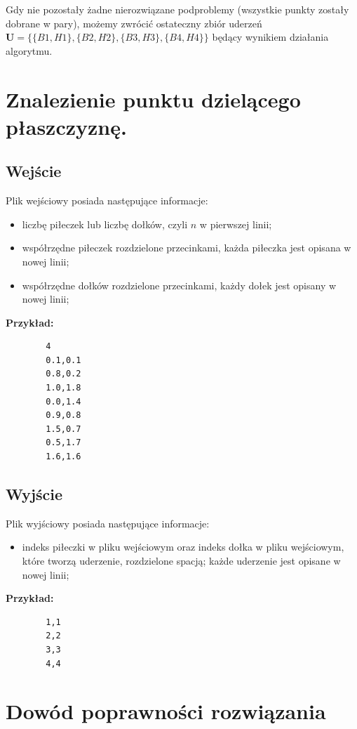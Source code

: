 \documentclass[10pt,a4paper]{article}
\begin{document}
	Gdy nie pozostały żadne nierozwiązane podproblemy (wszystkie punkty zostały dobrane w pary), możemy zwrócić ostateczny zbiór uderzeń $\mathbf{U} = \{\{B1,H1\},\{B2,H2\},\{B3,H3\},\{B4,H4\}\}$ będący wynikiem działania algorytmu.
		
	\section{Znalezienie punktu dzielącego płaszczyznę.}
	
	\subsection{Wejście}
	

	Plik wejściowy posiada następujące informacje:
	\begin{itemize}
		\item liczbę piłeczek lub liczbę dołków, czyli $n$ w pierwszej linii;
		\item współrzędne piłeczek rozdzielone przecinkami, każda piłeczka jest opisana w nowej linii;
		\item współrzędne dołków rozdzielone przecinkami, każdy dołek jest opisany w nowej linii;
	\end{itemize}

	\textbf{Przykład:} 
	
	\begin{verbatim}
		4
		0.1,0.1
		0.8,0.2
		1.0,1.8
		0.0,1.4
		0.9,0.8
		1.5,0.7
		0.5,1.7
		1.6,1.6
	\end{verbatim}
	
	\subsection{Wyjście}
	
	Plik wyjściowy posiada następujące informacje:
	\begin{itemize}
		\item indeks piłeczki w pliku wejściowym oraz indeks dołka w pliku wejściowym, które tworzą uderzenie, rozdzielone spacją; każde uderzenie jest opisane w nowej linii;
	\end{itemize}
	
	\textbf{Przykład:} 
	
	\begin{verbatim}
		1,1
		2,2
		3,3
		4,4
	\end{verbatim}
	
	\pagebreak
	
	\section{Dowód poprawności rozwiązania}
	
\end{document}
